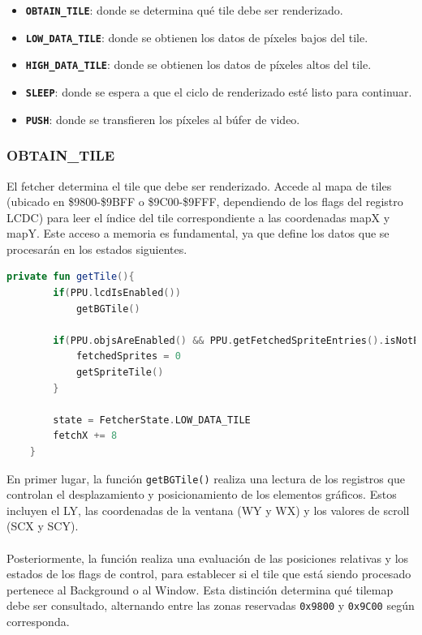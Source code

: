 \begin{itemize}
    \item \textbf{\texttt{OBTAIN\_TILE}}: donde se determina qué tile debe ser renderizado.
    \item \textbf{\texttt{LOW\_DATA\_TILE}}: donde se obtienen los datos de píxeles bajos del tile.
    \item \textbf{\texttt{HIGH\_DATA\_TILE}}: donde se obtienen los datos de píxeles altos del tile.
    \item \textbf{\texttt{SLEEP}}: donde se espera a que el ciclo de renderizado esté listo para continuar.
    \item \textbf{\texttt{PUSH}}: donde se transfieren los píxeles al búfer de video.
\end{itemize}

\subsubsection{OBTAIN\_TILE}
El fetcher determina el tile que debe ser renderizado. Accede al mapa de tiles (ubicado en \$9800-\$9BFF o \$9C00-\$9FFF, dependiendo de los flags del registro LCDC) para leer el índice del tile correspondiente a las coordenadas mapX y mapY. Este acceso a memoria es fundamental, ya que define los datos que se procesarán en los estados siguientes.

\begin{lstlisting}[language=Kotlin, caption={FIFO Fetcher - Obtención de Tile.}, label={code:ppufifogettile}]
    private fun getTile(){
        if(PPU.lcdIsEnabled())
            getBGTile()

        if(PPU.objsAreEnabled() && PPU.getFetchedSpriteEntries().isNotEmpty()) {
            fetchedSprites = 0
            getSpriteTile()
        }

        state = FetcherState.LOW_DATA_TILE
        fetchX += 8
    }
\end{lstlisting}

En primer lugar, la función \texttt{getBGTile()} realiza una lectura de los registros que controlan el desplazamiento y posicionamiento de los elementos gráficos. Estos incluyen el LY, las coordenadas de la ventana (WY y WX) y los valores de scroll (SCX y SCY).
\\\\
Posteriormente, la función realiza una evaluación de las posiciones relativas y los estados de los flags de control, para establecer si el tile que está siendo procesado pertenece al Background o al Window. Esta distinción determina qué tilemap debe ser consultado, alternando entre las zonas reservadas \texttt{0x9800} y \texttt{0x9C00} según corresponda.

